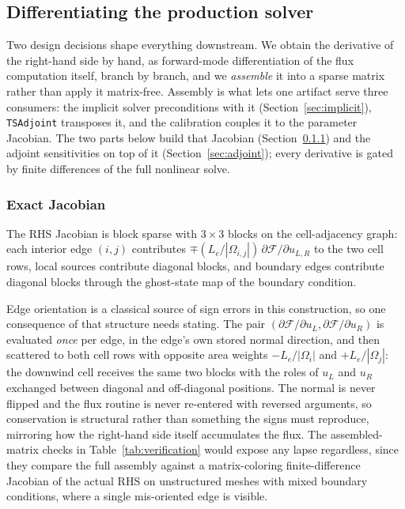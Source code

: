 \documentclass[11pt]{article}
\begin{document}
\subsection{Differentiating the production solver}
\label{sec:diff}

Two design decisions shape everything downstream. We obtain the
derivative of the right-hand side by hand, as forward-mode
differentiation of the flux computation itself, branch by branch, and
we \emph{assemble} it into a sparse matrix rather than apply it
matrix-free. Assembly is what lets one artifact serve three consumers:
the implicit solver preconditions with it
(Section~\ref{sec:implicit}), \texttt{TSAdjoint} transposes it, and
the calibration couples it to the parameter Jacobian. The two parts
below build that Jacobian (Section~\ref{sec:jacobian}) and the adjoint
sensitivities on top of it (Section~\ref{sec:adjoint}); every
derivative is gated by finite differences of the full nonlinear solve.

\subsubsection{Exact Jacobian}
\label{sec:jacobian}

The RHS Jacobian is block sparse with $3\times3$ blocks on the
cell-adjacency graph: each interior edge $(i,j)$ contributes
$\mp(L_e/|\Omega_{i,j}|)\,\partial\mathcal{F}/\partial u_{L,R}$ to the
two cell rows, local sources contribute diagonal blocks, and boundary
edges contribute diagonal blocks through the ghost-state map of the
boundary condition.

Edge orientation is a classical source of sign errors in this
construction, so one consequence of that structure needs stating. The
pair
$(\partial\mathcal{F}/\partial u_L, \partial\mathcal{F}/\partial u_R)$
is evaluated \emph{once} per edge, in the edge's own stored normal
direction, and then scattered to both cell rows with opposite area
weights $-L_e/|\Omega_i|$ and $+L_e/|\Omega_j|$: the downwind cell
receives the same two blocks with the roles of $u_L$ and $u_R$
exchanged between diagonal and off-diagonal positions. The normal is
never flipped and the flux routine is never re-entered with reversed
arguments, so conservation is structural rather than something the
signs must reproduce, mirroring how the right-hand side itself
accumulates the flux. The assembled-matrix
checks in Table~\ref{tab:verification} would expose any lapse
regardless, since they compare the full assembly against a
matrix-coloring finite-difference Jacobian of the actual RHS on
unstructured meshes with mixed boundary conditions, where a single
mis-oriented edge is visible.
\end{document}
